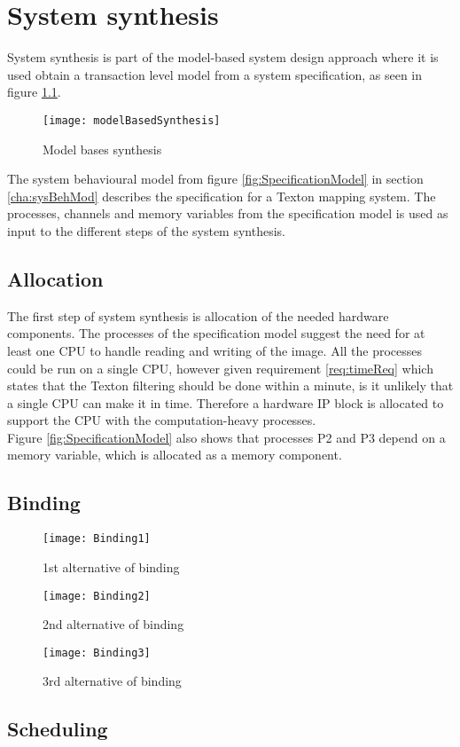 \chapter{System synthesis}
System synthesis is part of the model-based system design approach where it is used obtain a transaction level model from a system specification, as seen in figure \ref{fig:modelBasedSyn}. 

\begin{figure}[H]
\centering
\texttt{[image: modelBasedSynthesis]}
\caption{Model bases synthesis}
\label{fig:modelBasedSyn}
\end{figure}

The system behavioural model from figure \ref{fig:SpecificationModel} in section \ref{cha:sysBehMod} describes the specification for a Texton mapping system. 
The processes, channels and memory variables from the specification model is used as input to the different steps of the system synthesis.  

\section{Allocation}
The first step of system synthesis is allocation of the needed hardware components. 
The processes of the specification model suggest the need for at least one CPU to handle reading and writing of the image. 
All the processes could be run on a single CPU, however given requirement \ref{req:timeReq} which states that the Texton filtering should be done within a minute, is it unlikely that a single CPU can make it in time. 
Therefore a hardware IP block is allocated to support the CPU with the computation-heavy processes.
\\Figure \ref{fig:SpecificationModel} also shows that processes P2 and P3 depend on a memory variable, which is allocated as a memory component. 

\section{Binding}

\begin{figure}[H]
\centering
\texttt{[image: Binding1]}
\caption{1st alternative of binding}
\label{fig:Binding1}
\end{figure}

\begin{figure}[H]
\centering
\texttt{[image: Binding2]}
\caption{2nd alternative of binding}
\label{fig:Binding2}
\end{figure}

\begin{figure}[H]
\centering
\texttt{[image: Binding3]}
\caption{3rd alternative of binding}
\label{fig:Binding3}
\end{figure}


\section{Scheduling}